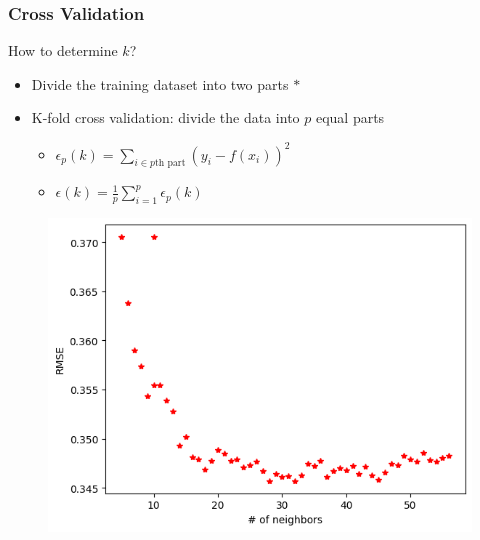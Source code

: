 \begin{frame}[fragile]
    \frametitle{Cross Validation}
    How to determine $k$?
    \begin{itemize}
        \item Divide the training dataset into two parts $*$
        \item K-fold cross validation: divide the data into $p$ equal parts
        \begin{itemize}
            \item $\epsilon_p(k) = \sum_{i \in p\text{th part}} (y_i - f(x_i))^2$
            \item $\epsilon(k) = \frac{1}{p} \sum_{i = 1}^p \epsilon_p(k)$
        \end{itemize}
    \end{itemize}
    \begin{figure}[H]
        \includegraphics[scale=0.45]{graphs/knn_choice_n.png}
    \end{figure}
\end{frame}

